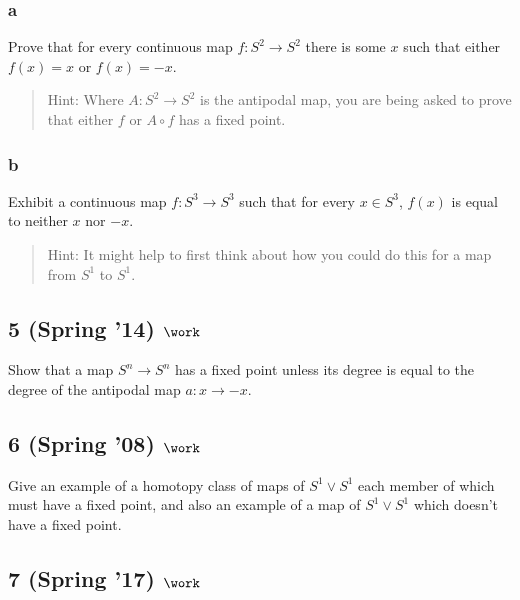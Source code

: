 \hypertarget{a-25}{%
\subsubsection{a}\label{a-25}}

Prove that for every continuous map \(f : S^2 \to S^2\) there is some
\(x\) such that either \(f (x) = x\) or \(f (x) = -x\).

\begin{quote}
Hint: Where \(A : S^2 \to S^2\) is the antipodal map, you are being
asked to prove that either \(f\) or \(A \circ f\) has a fixed point.
\end{quote}

\hypertarget{b-25}{%
\subsubsection{b}\label{b-25}}

Exhibit a continuous map \(f : S^3 \to S^3\) such that for every
\(x \in S^3\), \(f (x)\) is equal to neither \(x\) nor \(-x\).

\begin{quote}
Hint: It might help to first think about how you could do this for a map
from \(S^1\) to \(S^1\).
\end{quote}

\hypertarget{spring-14-work-3}{%
\subsection{\texorpdfstring{5 (Spring '14)
\(\work\)}{5 (Spring '14) \textbackslash work}}\label{spring-14-work-3}}

Show that a map \(S^n \to S^n\) has a fixed point unless its degree is
equal to the degree of the antipodal map \(a : x \to -x\).

\hypertarget{spring-08-work-3}{%
\subsection{\texorpdfstring{6 (Spring '08)
\(\work\)}{6 (Spring '08) \textbackslash work}}\label{spring-08-work-3}}

Give an example of a homotopy class of maps of \(S^1 \lor S^1\) each
member of which must have a fixed point, and also an example of a map of
\(S^1 \lor S^1\) which doesn't have a fixed point.

\hypertarget{spring-17-work-2}{%
\subsection{\texorpdfstring{7 (Spring '17)
\(\work\)}{7 (Spring '17) \textbackslash work}}\label{spring-17-work-2}}

